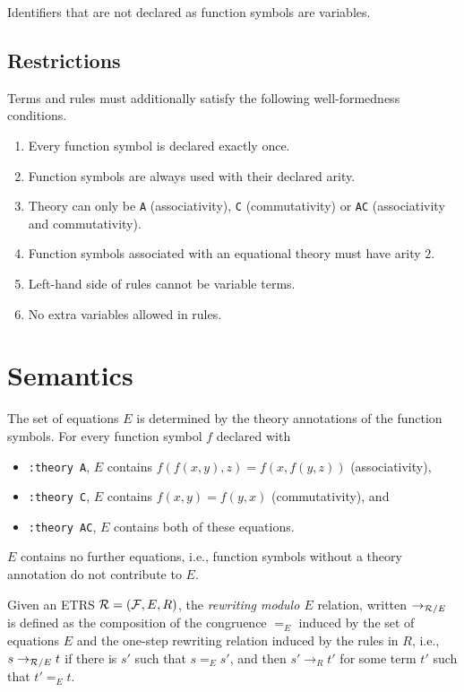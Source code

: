 Identifiers that are not declared as function symbols are variables.

\subsection{Restrictions}

Terms and rules must additionally satisfy the following well-formedness conditions.
\begin{enumerate}
    \item Every function symbol is declared exactly once.
    \item Function symbols are always used with their declared arity.
    \item Theory can only be \texttt{A} (associativity), \texttt{C} (commutativity) or \texttt{AC} (associativity and commutativity).
    \item Function symbols associated with an equational theory must have arity $2$.
    \item Left-hand side of rules cannot be variable terms.
    \item No extra variables allowed in rules.
\end{enumerate}

\section{Semantics}

The set of equations $E$ is determined by the theory annotations of the function symbols.
For every function symbol $f$ declared with
\begin{itemize}
  \item \texttt{:theory A}, $E$ contains $f(f(x,y),z) = f(x,f(y,z))$ (associativity),
  \item \texttt{:theory C}, $E$ contains $f(x,y) = f(y,x)$ (commutativity), and
  \item \texttt{:theory AC}, $E$ contains both of these equations.
\end{itemize}
$E$ contains no further equations, i.e., function symbols without a theory annotation do not contribute to $E$.

Given an ETRS ${\cal R}=({\cal F},E,R)$, 
the \emph{rewriting modulo $E$} relation, written $\to_{{\cal R}/E}$ is defined as the composition of the congruence $=_E$ induced by the set of equations $E$ and the one-step rewriting relation induced by the rules in $R$, i.e., $s\to_{{\cal R}/E}t$ if there is $s'$ such that $s=_Es'$, and then $s'\to_{R}t'$ for some term $t'$ such that $t'=_E t$.

